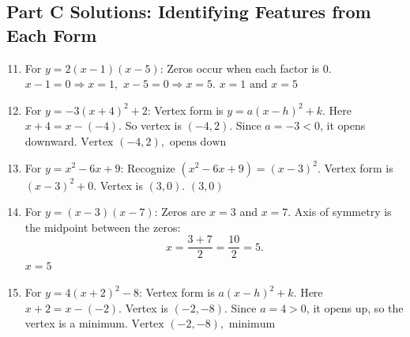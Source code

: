 \documentclass[14pt]{extarticle}
\begin{document}
\subsection*{Part C Solutions: Identifying Features from Each Form}
\begin{enumerate}
  \setcounter{enumi}{10}
  \item For \(y = 2(x - 1)(x - 5)\):  
  Zeros occur when each factor is 0.  
  \(x - 1 = 0 \Rightarrow x = 1,\)  
  \(x - 5 = 0 \Rightarrow x = 5.\)  
  \(\boxed{x = 1 \text{ and } x = 5}\)

  \item For \(y = -3(x + 4)^2 + 2\):  
  Vertex form is \(y = a(x - h)^2 + k\). Here \(x + 4 = x - (-4)\).  
  So vertex is \((-4, 2)\).  
  Since \(a = -3 < 0\), it opens downward.  
  \(\boxed{\text{Vertex } (-4, 2), \text{ opens down}}\)

  \item For \(y = x^2 - 6x + 9\):  
  Recognize \((x^2 - 6x + 9) = (x - 3)^2.\)  
  Vertex form is \((x - 3)^2 + 0.\)  
  Vertex is \((3, 0)\).  
  \(\boxed{(3, 0)}\)

  \item For \(y = (x - 3)(x - 7)\):  
  Zeros are \(x = 3\) and \(x = 7.\)  
  Axis of symmetry is the midpoint between the zeros:  
  \[
  x = \frac{3 + 7}{2} = \frac{10}{2} = 5.
  \]
  \(\boxed{x = 5}\)

  \item For \(y = 4(x + 2)^2 - 8\):  
  Vertex form is \(a(x - h)^2 + k\). Here \(x + 2 = x - (-2)\).  
  Vertex is \((-2, -8)\).  
  Since \(a = 4 > 0\), it opens up, so the vertex is a minimum.  
  \(\boxed{\text{Vertex } (-2, -8), \text{ minimum}}\)
\end{enumerate}
\end{document}
